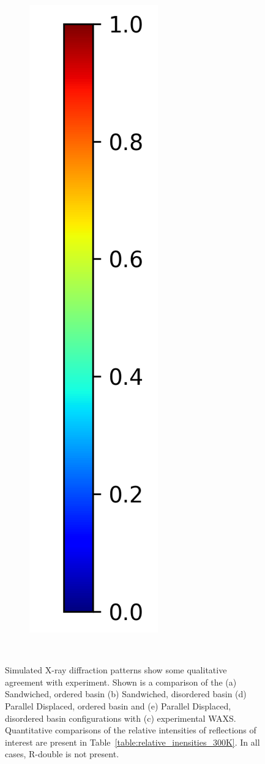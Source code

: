 \documentclass[journal=jpcbfk,manusciprt=article]{achemso}
\begin{document}
\begin{figure}[htb]
\begin{subfigure}{0.1\textwidth}
		\includegraphics[width=\linewidth]{colorbar_jet.png}
	\end{subfigure}	
	\caption{Simulated X-ray diffraction patterns show some qualitative agreement with 
	experiment. Shown is a comparison of the (a) Sandwiched, ordered basin (b) Sandwiched,
	disordered basin (d) Parallel Displaced, ordered basin and (e) Parallel Displaced, disordered basin 
	configurations with (c) experimental WAXS. Quantitative comparisons of the relative 
	intensities of reflections of interest are present in Table~\ref{table:relative_inensities_300K}. 
	In all cases, R-double is not present.}~\label{fig:XRDsim} 
  \end{figure}
  
\end{document}
